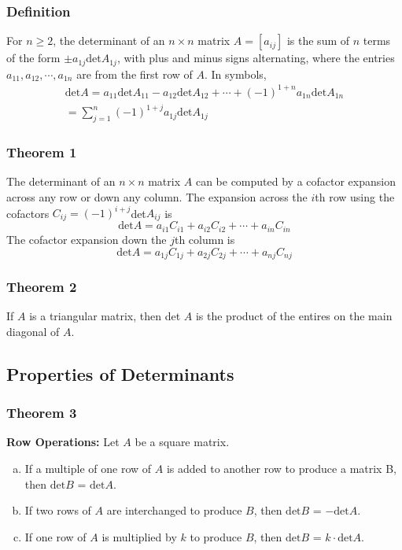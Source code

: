 \documentclass[letterpaper,11pt]{article}
\begin{document}
			\subsubsection{Definition}
				For $n\geq 2$, the determinant of an $n\times n$ matrix $A=[a_{ij}]$ is the sum of $n$ terms of the form $\pm a_{1j}$det$A_{1j}$, with plus and minus signs alternating, where the entries $a_{11},a_{12},\cdots,a_{1n}$ are from the first row of $A$. In symbols,
				\begin{eqnarray}					\textrm{det}A=a_{11}\textrm{det}A_{11}-a_{12}\textrm{det}A_{12}+\cdots+(-1)^{1+n}a_{1n}\textrm{det}A_{1n}\\
				=\sum_{j=1}^{n}(-1)^{1+j}a_{1j}\textrm{det}A_{1j}
				\end{eqnarray}
			\subsubsection{Theorem 1}
				The determinant of an $n\times n$ matrix $A$ can be computed by a cofactor expansion across any row or down any column. The expansion across the $i$th row using the cofactors $C_{ij}=(-1)^{i+j}$det$A_{ij}$ is
				\begin{equation}
					\textrm{det}A=a_{i1}C_{i1}+a_{i2}C_{i2}+\cdots+a_{in}C_{in}
				\end{equation}
				The cofactor expansion down the $j$th column is
				\begin{equation}
					\textrm{det}A=a_{1j}C_{1j}+a_{2j}C_{2j}+\cdots+a_{nj}C_{nj}
				\end{equation}
			\subsubsection{Theorem 2}
				If $A$ is a triangular matrix, then det $A$ is the product of the entires on the main diagonal of $A$.
		\subsection{Properties of Determinants}
			\subsubsection{Theorem 3}
				\textbf{Row Operations:} Let $A$ be a square matrix.
				\begin{enumerate}[a.]
					\item If a multiple of one row of $A$ is added to another row to produce a matrix B, then $\textrm{det}B$ = $\textrm{det}A$.
					\item If two rows of $A$ are interchanged to produce $B$, then $\textrm{det}B$ = $-\textrm{det}A$.
					\item If one row of $A$ is multiplied by $k$ to produce $B$, then $\textrm{det}B$ = $k\cdot\textrm{det}A$.
				\end{enumerate}
\end{document}
